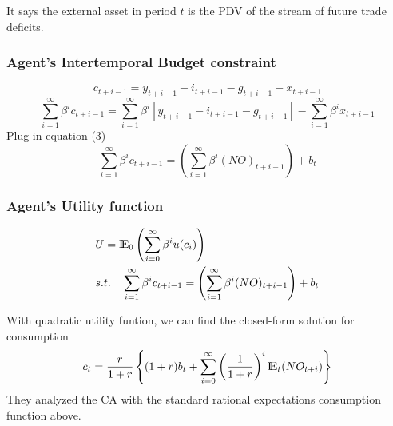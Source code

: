 \documentclass[12pt]{article}
\begin{document}
It says the external asset in period $ t $ is the PDV of the stream of future trade
deficits.



\subsubsection{Agent's Intertemporal Budget constraint}
\begin{equation}
c_{t + i - 1} = y_{t + i - 1} - i_{t + i - 1} - g_{t + i - 1} - x_{t + i - 1}
\end{equation}
\begin{equation}
\sum\limits_{i = 1} ^\infty \beta^{i} c_{t + i - 1} = \sum\limits_{i = 1} ^\infty 
\beta^{i} [y_{t + i - 1} - i_{t + i - 1} - g_{t + i - 1}] - 
\sum\limits_{i = 1} ^\infty \beta^{i}x_{t + i - 1}	
\end{equation}
Plug in equation (3)
\begin{equation}
\sum\limits_{i = 1} ^\infty \beta^{i} c_{t + i - 1} =\left( 
\sum\limits_{i = 1} ^\infty 
\beta^{i} (NO)_{t + i - 1}\right) 
 + b_{t}
\end{equation}


\subsubsection{Agent's Utility function}
\begin{align*}
&U = {\rm I\!{E}}_{0}\left( \sum\limits_{i = 0} ^\infty \beta^{i} u(c_{i})	 \right)\\
& s.t. \quad
\sum\limits_{i = 1} ^\infty \beta^{i} c_{t + i - 1} =\left( 
\sum\limits_{i = 1} ^\infty 
\beta^{i} (NO)_{t + i - 1}\right) 
 + b_{t}
\end{align*}


With quadratic utility funtion, we can find the closed-form solution for consumption
\begin{equation}
c_{t} = \frac{r}{1 + r}\left\{ 
(1 + r)b_{t} + \sum\limits_{i = 0} ^\infty \left( \frac{1}{1 + r} \right)^{i}
{\rm I\!{E}}_{t}(NO_{t + i})
\right\} 
\end{equation}
They analyzed the CA with the standard rational expectations consumption function above.
\noindent{}\\
\end{document}
